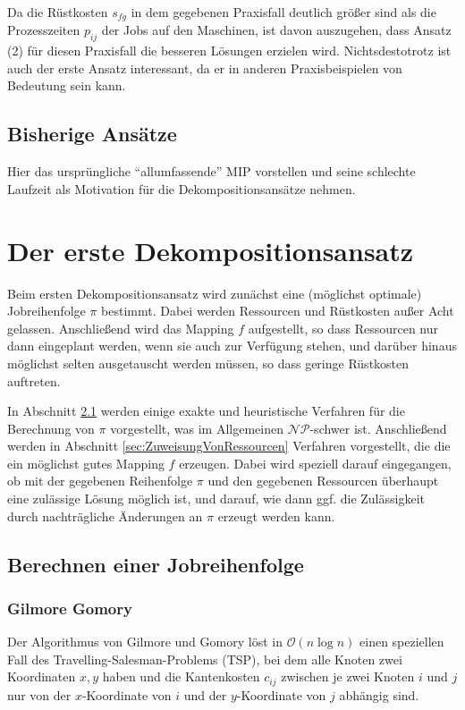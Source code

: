\documentclass{scrreprt}
\begin{document}
Da die Rüstkosten $s_{fg}$ in dem gegebenen Praxisfall deutlich größer sind als die Prozesszeiten $p_{ij}$ der Jobs auf den Maschinen,
ist davon auszugehen, dass Ansatz (2) für diesen Praxisfall die besseren Lösungen erzielen wird.
Nichtsdestotrotz ist auch der erste Ansatz interessant, da er in anderen Praxisbeispielen von Bedeutung sein kann.


\section{Bisherige Ansätze}
Hier das ursprüngliche "`allumfassende"' MIP vorstellen und seine schlechte Laufzeit als Motivation für die Dekompositionsansätze nehmen.



\chapter{Der erste Dekompositionsansatz}
Beim ersten Dekompositionsansatz wird zunächst eine (möglichst optimale) Jobreihenfolge $\pi$ bestimmt.
Dabei werden Ressourcen und Rüstkosten außer Acht gelassen. Anschließend wird das Mapping $f$ aufgestellt,
so dass Ressourcen nur dann eingeplant werden, wenn sie auch zur Verfügung stehen, und darüber hinaus
möglichst selten ausgetauscht werden müssen, so dass geringe Rüstkosten auftreten.

In Abschnitt \ref{sec:BerechnenEinerJobreihenfolge} werden einige exakte und heuristische Verfahren für die
Berechnung von $\pi$ vorgestellt, was im Allgemeinen $\mathcal{NP}$-schwer ist.
Anschließend werden in Abschnitt \ref{sec:ZuweisungVonRessourcen} Verfahren vorgestellt, die die ein möglichst gutes Mapping $f$ erzeugen.
Dabei wird speziell darauf eingegangen, ob mit der gegebenen Reihenfolge $\pi$ und den gegebenen Ressourcen
überhaupt eine zulässige Lösung möglich ist, und darauf, wie dann ggf. die Zulässigkeit durch nachträgliche Änderungen an $\pi$
erzeugt werden kann.

\section{Berechnen einer Jobreihenfolge}
\label{sec:BerechnenEinerJobreihenfolge}
\subsection{Gilmore Gomory}
Der Algorithmus von Gilmore und Gomory \cite{...} löst in $\mathcal{O}(n\log n)$ einen speziellen Fall des Travelling-Salesman-Problems (TSP),
bei dem alle Knoten zwei Koordinaten $x,y$ haben und die Kantenkosten $c_{ij}$ zwischen je zwei Knoten $i$ und $j$ nur von der $x$-Koordinate von $i$
und der $y$-Koordinate von $j$ abhängig sind.
\end{document}
